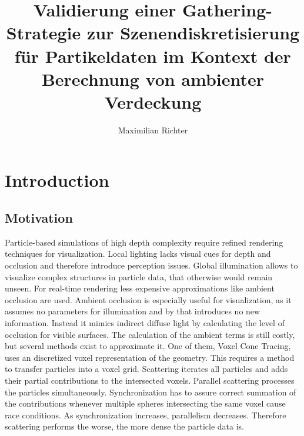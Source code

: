 \documentclass[hyperref,german,diplominf]{cgvpub}
\author{Maximilian Richter}
\title{Validierung einer Gathering-Strategie zur Szenendiskretisierung f\"ur Partikeldaten im Kontext der Berechnung von ambienter Verdeckung}
\begin{document}
\chapter{Introduction}

\section{Motivation}
Particle-based simulations of high depth complexity require refined rendering techniques for visualization. Local lighting lacks visual cues for depth and occlusion and therefore introduce perception issues.
Global illumination allows to visualize complex structures in particle data, that otherwise would remain unseen. For real-time rendering less expensive approximations like ambient occlusion are used. Ambient occlusion is especially useful for visualization, as it assumes no parameters for illumination and by that introduces no new information. Instead it mimics indirect diffuse light by calculating the level of occlusion for visible surfaces. The calculation of the ambient terms is still costly, but several methods exist to approximate it. One of them, Voxel Cone Tracing, uses an discretized voxel representation of the geometry. This requires a method to transfer particles into a voxel grid. Scattering iterates all particles and adds their partial contributions to the intersected voxels. Parallel scattering processes the particles simultaneously. Synchronization has to assure correct summation of the contributions whenever multiple spheres intersecting the same voxel cause race conditions. As synchronization increases, parallelism decreases. Therefore scattering performs the worse, the more dense the particle data is.
\end{document}
